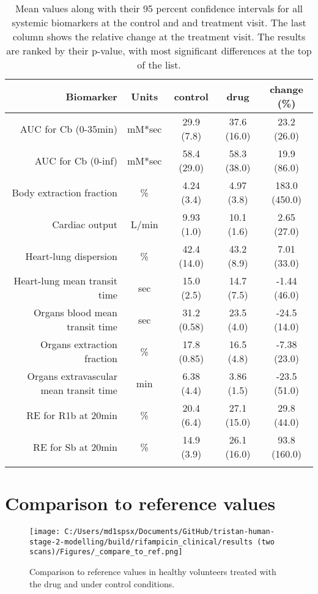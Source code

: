 \documentclass{epflreport}%
\begin{document}
\begin{longtable}{rcccc}%
\hline%
Biomarker&Units&control&drug&change (\%)\\%
\hline%
AUC for Cb (0{-}35min)&mM*sec&29.9 (7.8) &37.6 (16.0) &23.2 (26.0) \\%
AUC for Cb (0{-}inf)&mM*sec&58.4 (29.0) &58.3 (38.0) &19.9 (86.0) \\%
Body extraction fraction&\%&4.24 (3.4) &4.97 (3.8) &183.0 (450.0) \\%
Cardiac output&L/min&9.93 (1.0) &10.1 (1.6) &2.65 (27.0) \\%
Heart{-}lung dispersion&\%&42.4 (14.0) &43.2 (8.9) &7.01 (33.0) \\%
Heart{-}lung mean transit time&sec&15.0 (2.5) &14.7 (7.5) &{-}1.44 (46.0) \\%
Organs blood mean transit time&sec&31.2 (0.58) &23.5 (4.0) &{-}24.5 (14.0) \\%
Organs extraction fraction&\%&17.8 (0.85) &16.5 (4.8) &{-}7.38 (23.0) \\%
Organs extravascular mean transit time&min&6.38 (4.4) &3.86 (1.5) &{-}23.5 (51.0) \\%
RE for R1b at 20min&\%&20.4 (6.4) &27.1 (15.0) &29.8 (44.0) \\%
RE for Sb at 20min&\%&14.9 (3.9) &26.1 (16.0) &93.8 (160.0) \\%
\hline%
\caption{Mean values along with their 95 percent confidence intervals for all systemic biomarkers at the control and and treatment visit. The last column shows the relative change at the treatment visit. The results are ranked by their p-value, with most significant differences at the top of the list.} \\%
\end{longtable}%
\clearpage%
\section{Comparison to reference values}%
\label{sec:Comparisontoreferencevalues}%

%


\begin{figure}[h!]%
\centering%
\texttt{[image: C:/Users/md1spsx/Documents/GitHub/tristan-human-stage-2-modelling/build/rifampicin\_clinical/results (two scans)/Figures/\_compare\_to\_ref.png]}%
\caption{Comparison to reference values in healthy volunteers treated with the drug and under control conditions.}%
\end{figure}

%
\clearpage%
\end{document}
